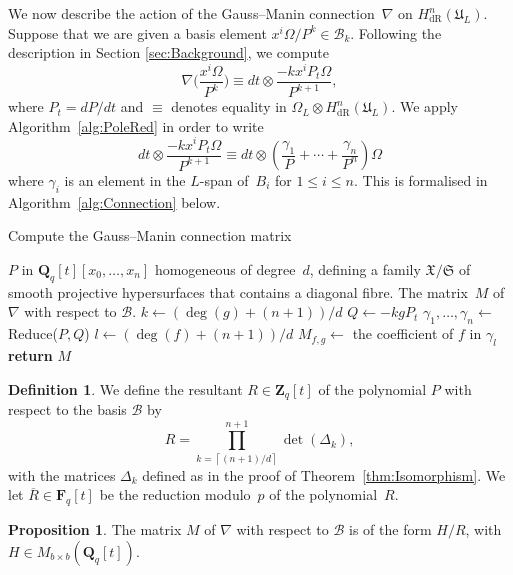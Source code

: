\documentclass[a4paper,11pt]{article}
\numberwithin{equation}{section}
\providecommand{\ceil}[1]{\left\lceil#1\right\rceil}   %
\newcommand{\ZZ}{\mathbf{Z}} %
\newcommand{\QQ}{\mathbf{Q}} %
\newcommand{\FF}{\mathbf{F}} %
\providecommand{\HdR}{H_{\text{dR}}}    %
\providecommand{\cB}{\mathcal{B}} %
\theoremstyle{definition}
\newtheorem{prop}[thm]{Proposition}
\newtheorem{defn}[thm]{Definition}
\begin{document}
We now describe the action of the Gauss--Manin connection~$\nabla$ on 
$\HdR^n(\mathfrak{U}_L)$.  Suppose that we are given a basis element 
$x^i \Omega / P^k \in \cB_k$.  Following the description in Section \ref{sec:Background}, 
we compute
\begin{equation} \label{eqn:nabla}
\nabla \biggl(\frac{x^i \Omega}{P^k}\biggr) \equiv 
dt \otimes \frac{- k x^i P_t \Omega}{P^{k+1}},
\end{equation}
where $P_t = dP/dt$ and $\equiv$ denotes equality in 
$\Omega_{L} \otimes \HdR^n(\mathfrak{U}_L)$. We apply 
Algorithm~\ref{alg:PoleRed} in order to write
\begin{equation}
dt \otimes \frac{- k x^i P_t \Omega}{P^{k+1}} \equiv 
dt \otimes \left( \frac{\gamma_{1}}{P} + \dotsb + \frac{\gamma_n}{P^n} \right) \Omega
\end{equation}
where $\gamma_i$ is an element in the $L$-span of~$B_i$ for $1 \leq i \leq n$. This is
formalised in Algorithm~\ref{alg:Connection} below.

\begin{algorithm}
\caption{Compute the Gauss--Manin connection matrix}
\label{alg:Connection}
\begin{algorithmic}
\Require $P$ in $\QQ_q[t][x_0, \dotsc, x_n]$ homogeneous of degree~$d$, 
         defining a family $\mathfrak{X}/\mathfrak{S}$ of smooth projective 
         hypersurfaces that contains a diagonal fibre.
\Ensure  The matrix~$M$ of $\nabla$ with respect to $\cB$.
\State $k \gets  (\deg(g)+(n+1))/d$
\State $Q \gets  - k g P_t$
\State $\gamma_{1}, \dotsc, \gamma_n \gets$
      {\sc Reduce($P,Q$)} 
\State $l \gets (\deg(f)+(n+1))/d$
\State $M_{f,g} \gets$ the coefficient of $f$ in $\gamma_l$
\EndFor
\EndFor
\textbf{return} $M$
\EndProcedure
\end{algorithmic}
\end{algorithm}

\begin{defn} \label{defn:resultant}
We define the resultant $R \in \ZZ_q[t]$ of the polynomial $P$ with respect to the
basis $\cB$ by
\[
R = \prod_{k=\ceil{(n+1)/d}}^{n+1}  \det(\Delta_k),
\]
with the matrices $\Delta_k$ defined as in the proof of Theorem~\ref{thm:Isomorphism}. 
We let $\overline{R} \in \FF_q[t]$ be the reduction modulo~$p$ of the polynomial~$R$.
\end{defn}

\begin{prop} \label{thm:denom}
The matrix $M$ of $\nabla$ with respect to $\cB$ is of the form
$H/R$, with $H \in M_{b \times b}(\QQ_q[t])$.
\end{prop}
\end{document}
